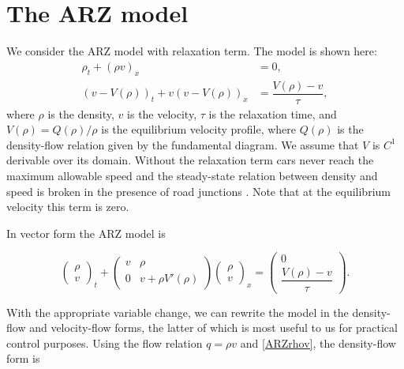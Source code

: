 \documentclass[5p,twocolumn]{elsarticle}
\begin{document}
\section{The ARZ model} \label{ARZSection}


We consider the ARZ model with relaxation term. The model is shown here: 
\begin{align} 
\rho_t + (\rho v)_x &= 0, \label{ARZ1} \\
(v - V(\rho))_t + v(v - V(\rho))_x &=\dfrac{V(\rho) - v}{\tau} \label{ARZ2},
\end{align}
where $\rho$ is the density, $v$ is the velocity, $\tau$ is the relaxation time, and $V(\rho) = Q(\rho)/\rho$ is the equilibrium velocity profile, where $Q(\rho)$ is the density-flow relation given by the fundamental diagram. We assume that $V$ is $C^{1}$ derivable over its domain. Without the relaxation term cars never reach the maximum allowable speed \cite{R_improved} and the steady-state relation between density and speed is broken in the presence of road junctions \cite{jin2015}. Note that at the equilibrium velocity this term is zero. 

In vector form the ARZ model is

{\footnotesize
\begin{equation} \label{ARZrhov}
\begin{pmatrix}
\rho \\ v
\end{pmatrix}_t
+ \begin{pmatrix}
v & \rho \\
0 & v + \rho V' (\rho)
\end{pmatrix}
\begin{pmatrix}
\rho \\ v
\end{pmatrix}_x = 
\begin{pmatrix}
0 \\ \dfrac{V(\rho) - v}{\tau}
\end{pmatrix}.
\end{equation}
}

With the appropriate variable change, we can rewrite the model in the density-flow and velocity-flow forms, the latter of which is most useful to us for practical control purposes. Using the flow relation $q = \rho v$ and \eqref{ARZrhov}, the density-flow form is
\end{document}
